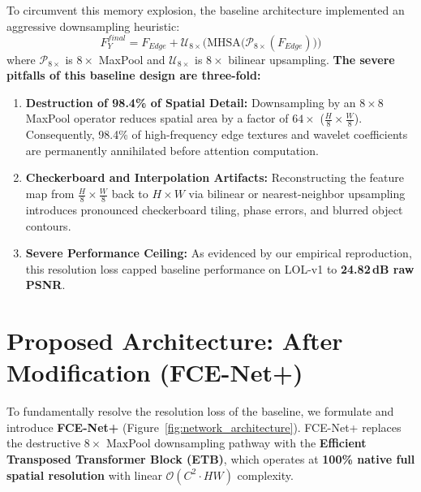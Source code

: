 \documentclass[10pt,twocolumn,letterpaper]{article}
\begin{document}
To circumvent this memory explosion, the baseline architecture implemented an aggressive downsampling heuristic:
\begin{equation}
F_Y^{final} = F_{Edge} + \mathcal{U}_{8\times}\Big( \text{MHSA}\big( \mathcal{P}_{8\times}(F_{Edge}) \big) \Big)
\end{equation}
where $\mathcal{P}_{8\times}$ is $8\times$ MaxPool and $\mathcal{U}_{8\times}$ is $8\times$ bilinear upsampling.
\textbf{The severe pitfalls of this baseline design are three-fold:}
\begin{enumerate}
    \item \textbf{Destruction of 98.4\% of Spatial Detail:} Downsampling by an $8\times8$ MaxPool operator reduces spatial area by a factor of $64\times$ ($\frac{H}{8} \times \frac{W}{8}$). Consequently, 98.4\% of high-frequency edge textures and wavelet coefficients are permanently annihilated before attention computation.
    \item \textbf{Checkerboard and Interpolation Artifacts:} Reconstructing the feature map from $\frac{H}{8} \times \frac{W}{8}$ back to $H \times W$ via bilinear or nearest-neighbor upsampling introduces pronounced checkerboard tiling, phase errors, and blurred object contours.
    \item \textbf{Severe Performance Ceiling:} As evidenced by our empirical reproduction, this resolution loss capped baseline performance on LOL-v1 to \textbf{24.82\,dB raw PSNR}.
\end{enumerate}

\section{Proposed Architecture: After Modification (FCE-Net+)}
\label{sec:after_modification}
To fundamentally resolve the resolution loss of the baseline, we formulate and introduce \textbf{FCE-Net+} (Figure~\ref{fig:network_architecture}). FCE-Net+ replaces the destructive $8\times$ MaxPool downsampling pathway with the \textbf{Efficient Transposed Transformer Block (ETB)}, which operates at \textbf{100\% native full spatial resolution} with linear $\mathcal{O}(C^2 \cdot HW)$ complexity.
\end{document}
